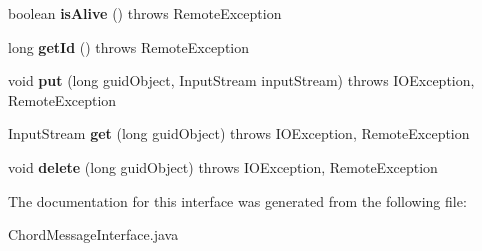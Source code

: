 \begin{DoxyCompactItemize}
boolean {\bfseries is\+Alive} ()  throws Remote\+Exception
\item 
\mbox{\label{interface_chord_message_interface_aaa28e7b91333c557955404ee8d26d65a}} 
long {\bfseries get\+Id} ()  throws Remote\+Exception
\item 
\mbox{\label{interface_chord_message_interface_a0731e7364624abf44be7ddb7a0d34341}} 
void {\bfseries put} (long guid\+Object, Input\+Stream input\+Stream)  throws I\+O\+Exception, Remote\+Exception
\item 
\mbox{\label{interface_chord_message_interface_ad25e17fc24b4204afb6af590922bae5a}} 
Input\+Stream {\bfseries get} (long guid\+Object)  throws I\+O\+Exception, Remote\+Exception
\item 
\mbox{\label{interface_chord_message_interface_a2bd41258d7f62c5959907e4d3170fc70}} 
void {\bfseries delete} (long guid\+Object)  throws I\+O\+Exception, Remote\+Exception
\end{DoxyCompactItemize}


The documentation for this interface was generated from the following file\+:\begin{DoxyCompactItemize}
\item 
Chord\+Message\+Interface.\+java\end{DoxyCompactItemize}
